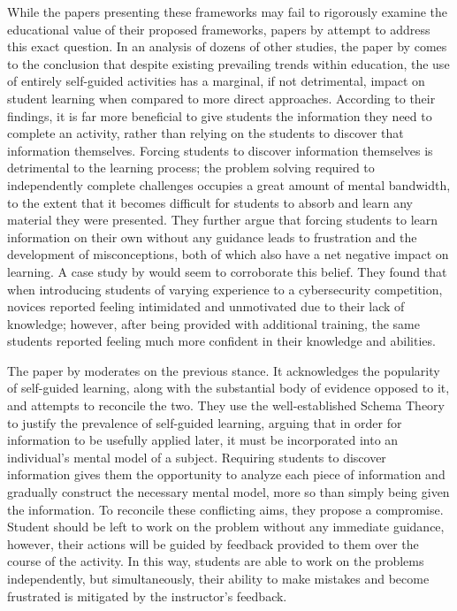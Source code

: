     While the papers presenting these frameworks may fail to rigorously examine the educational value of their proposed frameworks, papers by \textcite{J-Sweller,R-Weiss} attempt to address this exact question. %
In an analysis of dozens of other studies, the paper by \citeauthor{J-Sweller} comes to the conclusion that despite existing prevailing trends within education, the use of entirely self-guided activities has a marginal, if not detrimental, impact on student learning when compared to more direct approaches. %
According to their findings, it is far more beneficial to give students the information they need to complete an activity, rather than relying on the students to discover that information themselves. %
Forcing students to discover information themselves is detrimental to the learning process; %
the problem solving required to independently complete challenges occupies a great amount of mental bandwidth, to the extent that it becomes difficult for students to absorb and learn any material they were  presented. %
They further argue that forcing students to learn information on their own without any guidance leads to frustration and the development of misconceptions, both of which also have a net negative impact on learning. %
A case study by \textcite{L-Thomas} would seem to corroborate this belief. %
They found that when introducing students of varying experience to a cybersecurity competition, novices reported feeling intimidated and unmotivated due to their lack of knowledge; %
however, after being provided with additional training, the same students reported feeling much more confident in their knowledge and abilities. 

    The paper by \textcite{R-Weiss} moderates on the previous stance. %
It acknowledges the popularity of self-guided learning, along with the substantial body of evidence opposed to it, and attempts to reconcile the two. %
They use the well-established Schema Theory to justify the prevalence of self-guided learning, arguing that in order for information to be usefully applied later, it must be incorporated into an individual's mental model of a subject. %
Requiring students to discover information gives them the opportunity to analyze each piece of information and gradually construct the necessary mental model, more so than simply being given the information. %
To reconcile these conflicting aims, they propose a compromise. %
Student should be left to work on the problem without any immediate guidance, however, their actions will be guided by feedback provided to them over the course of the activity. %
In this way, students are able to work on the problems independently, but simultaneously, their ability to make mistakes and become frustrated is mitigated by the instructor's feedback. 

